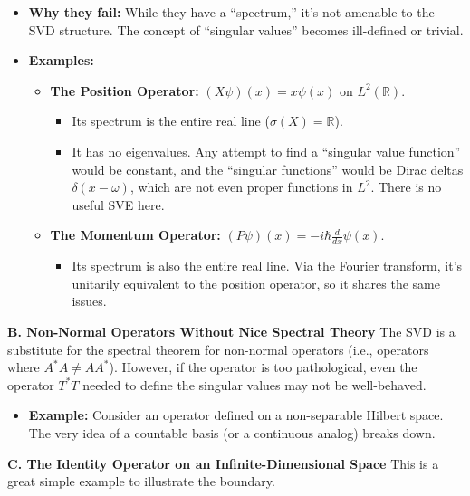 \documentclass[aps,prl,reprint]{revtex4-2}
\begin{document}
\begin{itemize}
\item \textbf{Why they fail:} While they have a ``spectrum,'' it's not
amenable to the SVD structure. The concept of ``singular values'' becomes
ill-defined or trivial.

\item \textbf{Examples:} 

\begin{itemize}
\item \textbf{The Position Operator:} $(X\psi)(x) = x \psi(x)$ on $L^2(%
\mathbb{R})$. 

\begin{itemize}
\item Its spectrum is the entire real line ($\sigma(X) = \mathbb{R}$). 

\item It has no eigenvalues. Any attempt to find a ``singular value
function'' would be constant, and the ``singular functions'' would be Dirac
deltas $\delta(x-\omega)$, which are not even proper functions in $L^2$.
There is no useful SVE here. 
\end{itemize}

\item \textbf{The Momentum Operator:} $(P\psi)(x) = -i \hbar \frac{d}{dx}
\psi(x)$. 

\begin{itemize}
\item Its spectrum is also the entire real line. Via the Fourier transform,
it's unitarily equivalent to the position operator, so it shares the same
issues. 
\end{itemize}
\end{itemize}
\end{itemize}

\textbf{B. Non-Normal Operators Without Nice Spectral Theory} The SVD is a
substitute for the spectral theorem for non-normal operators (i.e.,
operators where $A^*A \neq AA^*$). However, if the operator is too
pathological, even the operator $T^*T$ needed to define the singular values
may not be well-behaved.

\begin{itemize}
\item \textbf{Example:} Consider an operator defined on a non-separable
Hilbert space. The very idea of a countable basis (or a continuous analog)
breaks down.
\end{itemize}

\textbf{C. The Identity Operator on an Infinite-Dimensional Space} This is a
great simple example to illustrate the boundary.
\end{document}

